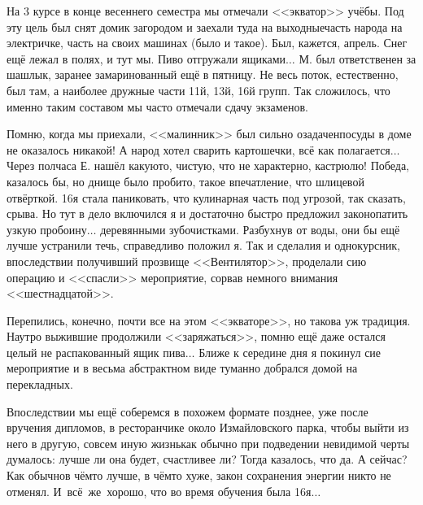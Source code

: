 На 3 курсе в конце весеннего семестра мы отмечали <<экватор>> учёбы. Под эту цель был снят домик загородом и заехали туда на выходные\mdash часть народа на электричке, часть на своих машинах (было и такое). Был, кажется, апрель. Снег ещё лежал в полях, и тут мы. Пиво отгружали ящиками$\ldots$ М. был ответственен за шашлык, заранее замаринованный ещё в пятницу. Не весь поток, естественно, был там, а наиболее дружные части 11\sdash й, 13\sdash й, 16\sdash й групп. Так сложилось, что именно таким составом мы часто отмечали сдачу экзаменов.

Помню, когда мы приехали, <<малинник>> был сильно озадачен\mdash посуды в доме не оказалось никакой! А народ хотел сварить картошечки, всё как полагается$\ldots$ Через полчаса Е. нашёл какую\sdash то, чистую, что не характерно, кастрюлю! Победа, казалось бы, но днище было пробито, такое впечатление, что шлицевой отвёрткой. 16\sdash я стала паниковать, что кулинарная часть под угрозой, так сказать, срыва. Но тут в дело включился я и достаточно быстро предложил законопатить узкую пробоину$\ldots$ деревянными зубочистками. Разбухнув от воды, они бы ещё лучше устранили течь, справедливо положил я. Так и сделали\mdash я и однокурсник, впоследствии получивший прозвище <<Вентилятор>>, проделали сию операцию и <<спасли>> мероприятие, сорвав немного внимания <<шестнадцатой>>.

Перепились, конечно, почти все на этом <<экваторе>>, но такова уж традиция. Наутро выжившие продолжили <<заряжаться>>, помню ещё даже остался целый не распакованный ящик пива$\ldots$ Ближе к середине дня я покинул сие мероприятие и в весьма абстрактном виде туманно добрался домой на перекладных. 

Впоследствии мы ещё соберемся в похожем формате позднее, уже после вручения дипломов, в ресторанчике около Измайловского парка, чтобы выйти из него в другую, совсем иную жизнь\mdash как обычно при подведении невидимой черты думалось: лучше ли она будет, счастливее ли? Тогда казалось, что да. А сейчас? Как обычно\mdash в чём\sdash то лучше, в чём\sdash то хуже, закон сохранения энергии никто не отменял. И~всё~же\mdash~хорошо, что во время обучения была 16\sdash я$\ldots$

\begin{center}
\end{center}